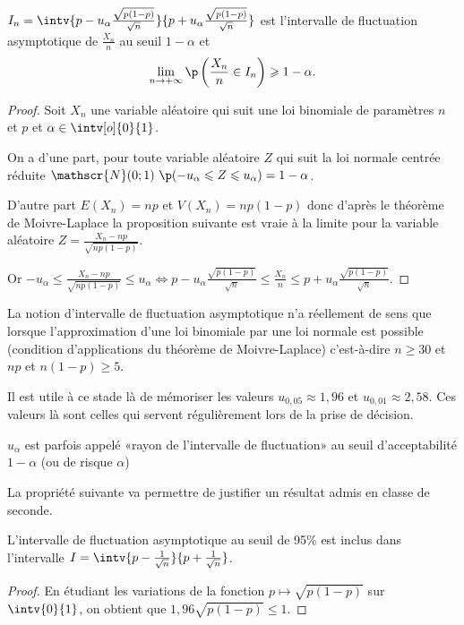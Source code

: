 \documentclass[12pt,a4paper,french]{article}
\begin{document}
\begin{proposition}
  $I_n = \intv{ p - u_{\alpha}\frac{\sqrt{p(1-p)}}{\sqrt{n}}}{p +
  u_{\alpha}\frac{\sqrt{p(1-p)}}{\sqrt{n}} }$ est l'intervalle de
  fluctuation asymptotique de $\frac{X_n}{n}$ au seuil $1 - \alpha$ et
  \[ \lim_{n\to +\infty} \p\left(\frac{X_n}{n} \in I_n \right) \geqslant
  1 - \alpha.\]
  \begin{proof}
    Soit $X_n$ une variable aléatoire qui suit une loi binomiale de
    paramètres $n$ et $p$ et $\alpha \in \intv[o]{0}{1}$.

    On a d'une part, pour toute variable aléatoire $Z$ qui suit la loi
    normale centrée réduite $\mathscr{N}(0;1) \ \p(-u_{\alpha} \leqslant
    Z \leqslant u_{\alpha}) = 1 - \alpha$.

    D'autre part $E(X_n) = np $ et $V(X_n) = np(1 - p)$ donc d'après le
    théorème de Moivre-Laplace la proposition suivante est vraie à la
    limite pour la variable aléatoire $Z = \frac{X_n -
    np}{\sqrt{np(1-p)}}$.

    Or $-u_{\alpha} \leqslant \frac{X_n - np}{\sqrt{np(1-p)}} \leqslant
    u_{\alpha}  \iff p - u_{\alpha} \frac{\sqrt{p(1-p)}}{\sqrt{n}}
    \leqslant \frac{X_n}{n} \leqslant p + u_{\alpha}
    \frac{\sqrt{p(1-p)}}{\sqrt{n}}$.
  \end{proof}
\end{proposition}

\begin{remarque}
  La notion d'intervalle de fluctuation asymptotique n'a réellement de
  sens que lorsque l'approximation d'une loi binomiale par une loi
  normale est possible (condition d'applications du théorème de
  Moivre-Laplace) c'est-à-dire $n \geqslant 30$ et $np$ et $n(1-p)
  \geqslant 5$.
\end{remarque}

Il est utile à ce stade là de mémoriser les valeurs $u_{0,05} \approx
1,96$ et $u_{0,01} \approx 2,58$. Ces valeurs là sont celles qui servent
régulièrement lors de la prise de décision.

\begin{remarque} $u_{\alpha}$ est parfois appelé «rayon de l'intervalle
  de fluctuation» au seuil d'acceptabilité $1 - \alpha$ (ou de risque
  $\alpha$)
\end{remarque}

La propriété suivante va permettre de justifier un résultat admis en
classe de seconde.

\begin{proposition}
  L'intervalle de fluctuation asymptotique au seuil de 95\% est inclus
  dans l'intervalle $I = \intv{p - \frac1{\sqrt{n}}}{p +
  \frac1{\sqrt{n}}}$.
  \begin{proof}
    En étudiant les variations de la fonction $p\mapsto \sqrt{p(1-p)}$
    sur $\intv{0}{1}$, on obtient que $1,96\sqrt{p(1-p)} \leqslant 1$.
  \end{proof}
\end{proposition}
\end{document}
